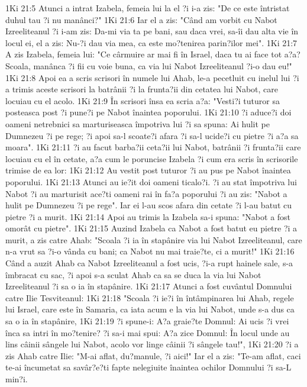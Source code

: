 1Ki 21:5  Atunci a intrat Izabela, femeia lui la el ?i i-a zis: "De ce este întristat duhul tau ?i nu manânci?"
1Ki 21:6  Iar el a zis: "Când am vorbit cu Nabot Izreeliteanul ?i i-am zis: Da-mi via ta pe bani, sau daca vrei, sa-îi dau alta vie în locul ei, el a zis: Nu-?i dau via mea, ca este mo?tenirea parin?ilor mei".
1Ki 21:7  A zis Izabela, femeia lui: "Ce cârmuire ar mai fi în Israel, daca tu ai face tot a?a? Scoala, manânca ?i fii cu voie buna, ca via lui Nabot Izreeliteanul ?i-o dau eu!"
1Ki 21:8  Apoi ea a scris scrisori în numele lui Ahab, le-a pecetluit cu inelul lui ?i a trimis aceste scrisori la batrânii ?i la frunta?ii din cetatea lui Nabot, care locuiau cu el acolo.
1Ki 21:9  În scrisori însa ea scria a?a: "Vesti?i tuturor sa posteasca post ?i pune?i pe Nabot înaintea poporului.
1Ki 21:10  ?i aduce?i doi oameni netrebnici sa marturiseasca împotriva lui ?i sa spuna: Ai hulit pe Dumnezeu ?i pe rege; ?i apoi sa-l scoate?i afara ?i sa-l ucide?i cu pietre ?i a?a sa moara".
1Ki 21:11  ?i au facut barba?ii ceta?ii lui Nabot, batrânii ?i frunta?ii care locuiau cu el în cetate, a?a cum le poruncise Izabela ?i cum era scris în scrisorile trimise de ea lor:
1Ki 21:12  Au vestit post tuturor ?i au pus pe Nabot înaintea poporului.
1Ki 21:13  Atunci au ie?it doi oameni ticalo?i. ?i au stat împotriva lui Nabot ?i au marturisit ace?ti oameni rai în fa?a poporului ?i au zis: "Nabot a hulit pe Dumnezeu ?i pe rege". Iar ei l-au scos afara din cetate ?i l-au batut cu pietre ?i a murit.
1Ki 21:14  Apoi au trimis la Izabela sa-i spuna: "Nabot a fost omorât cu pietre".
1Ki 21:15  Auzind Izabela ca Nabot a fost batut eu pietre ?i a murit, a zis catre Ahab: "Scoala ?i ia în stapânire via lui Nabot Izreeliteanul, care n-a vrut sa ?i-o vânda cu bani; ca Nabot nu mai traie?te, ci a murit!"
1Ki 21:16  Când a auzit Ahab ca Nabot Izreeliteanul a fost ucis, ?i-a rupt hainele sale, s-a îmbracat cu sac, ?i apoi s-a sculat Ahab ca sa se duca la via lui Nabot Izreeliteanul ?i sa o ia în stapânire.
1Ki 21:17  Atunci a fost cuvântul Domnului catre Ilie Tesviteanul:
1Ki 21:18  "Scoala ?i ie?i în întâmpinarea lui Ahab, regele lui Israel, care este în Samaria, ca iata acum e la via lui Nabot, unde s-a dus ca sa o ia în stapânire,
1Ki 21:19  ?i spune-i: A?a graie?te Domnul: Ai ucis ?i vrei înca sa intri în mo?tenire? ?i sa-i mai spui: A?a zice Domnul: În locul unde au lins câinii sângele lui Nabot, acolo vor linge câinii ?i sângele tau!",
1Ki 21:20  ?i a zis Ahab catre Ilie: "M-ai aflat, du?manule, ?i aici!" Iar el a zis: "Te-am aflat, caci te-ai încumetat sa savâr?e?ti fapte nelegiuite înaintea ochilor Domnului ?i sa-L min?i.

